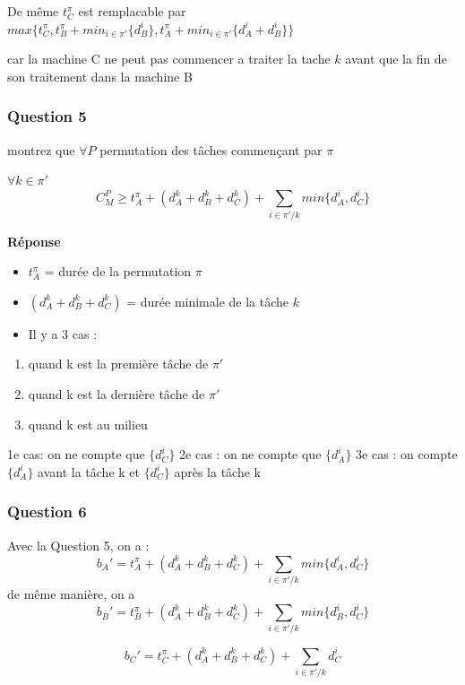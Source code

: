 De même \(t_C^\pi\) est remplacable par
\(max \{t_C^\pi ,t_B^\pi + min_{i \in \pi'}\{d_B^i\}, t_A^\pi +min_{i \in \pi'}\{d_A^i + d_B^i\}\}\)

car la machine C ne peut pas commencer a traiter la tache \(k\) avant
que la fin de son traitement dans la machine B

\subsubsection{Question 5}\label{question-5}

montrez que \(\forall P\) permutation des tâches commençant par \(\pi\)

\(\forall k\in \pi'\)
\[ C_M^P \geq t_A^\pi + (d_A^k+d_B^k+d_C^k) + \sum_{i \in \pi' /k}min\{d_A^i,d_C^i\} \]

\textbf{Réponse}

\begin{itemize}
\item
  \(t_A^\pi\) = durée de la permutation \(\pi\)
\item
  \((d_A^k+d_B^k+d_C^k)\) = durée minimale de la tâche \(k\)
\item
  Il y a 3 cas :
\end{itemize}

\begin{enumerate}
\def\labelenumi{\arabic{enumi}.}
\itemsep1pt\parskip0pt
\item
  quand k est la première tâche de \(\pi'\)
\item
  quand k est la dernière tâche de \(\pi'\)
\item
  quand k est au milieu
\end{enumerate}

1e cas: on ne compte que \(\{d_C^i\}\) 2e cas : on ne compte que
\(\{d_A^i\}\) 3e cas : on compte \(\{d_A^i\}\) avant la tâche k et
\(\{d_C^i\}\) après la tâche k

\subsubsection{Question 6}\label{question-6}

Avec la Question 5, on a :
\[ b_A' = t_A^\pi + (d_A^k+d_B^k+d_C^k) + \sum_{i \in \pi' /k}min\{d_A^i,d_C^i\} \]
de même manière, on a
\[ b_B' = t_B^\pi + (d_A^k+d_B^k+d_C^k) + \sum_{i \in \pi' /k}min\{d_B^i,d_C^i\} \]

\[ b_C' = t_C^\pi + (d_A^k+d_B^k+d_C^k) + \sum_{i \in \pi' /k } d_C^i \]

